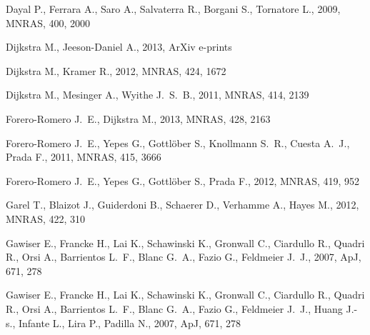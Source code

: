 \documentclass[usenatbib]{mn2e}
\newcommand{\apj}{ApJ}
\newcommand{\mnras}{MNRAS}
\begin{document}
{\begin{thebibliography}{}
{Dayal} P.,  {Ferrara} A.,  {Saro} A.,  {Salvaterra} R.,  {Borgani} S.,
  {Tornatore} L.,  2009, \mnras, 400, 2000

{Dijkstra} M.,  {Jeeson-Daniel} A.,  2013, ArXiv e-prints

{Dijkstra} M.,  {Kramer} R.,  2012, \mnras, 424, 1672

{Dijkstra} M.,  {Mesinger} A.,    {Wyithe} J.~S.~B.,  2011, \mnras, 414, 2139

{Forero-Romero} J.~E.,  {Dijkstra} M.,  2013, \mnras, 428, 2163

{Forero-Romero} J.~E.,  {Yepes} G.,  {Gottl{\"o}ber} S.,  {Knollmann} S.~R.,
  {Cuesta} A.~J.,    {Prada} F.,  2011, \mnras, 415, 3666

{Forero-Romero} J.~E.,  {Yepes} G.,  {Gottl{\"o}ber} S.,    {Prada} F.,  2012,
  \mnras, 419, 952

{Garel} T.,  {Blaizot} J.,  {Guiderdoni} B.,  {Schaerer} D.,  {Verhamme} A.,
  {Hayes} M.,  2012, \mnras, 422, 310

{Gawiser} E.,  {Francke} H.,  {Lai} K.,  {Schawinski} K.,  {Gronwall} C.,
  {Ciardullo} R.,  {Quadri} R.,  {Orsi} A.,  {Barrientos} L.~F.,  {Blanc}
  G.~A.,  {Fazio} G.,    {Feldmeier} J.~J.,  2007, \apj, 671, 278

{Gawiser} E.,  {Francke} H.,  {Lai} K.,  {Schawinski} K.,  {Gronwall} C.,
  {Ciardullo} R.,  {Quadri} R.,  {Orsi} A.,  {Barrientos} L.~F.,  {Blanc}
  G.~A.,  {Fazio} G.,  {Feldmeier} J.~J.,  {Huang} J.-s.,  {Infante} L.,
  {Lira} P.,    {Padilla} N.,  2007, \apj, 671, 278


\end{thebibliography}}
\end{document}
